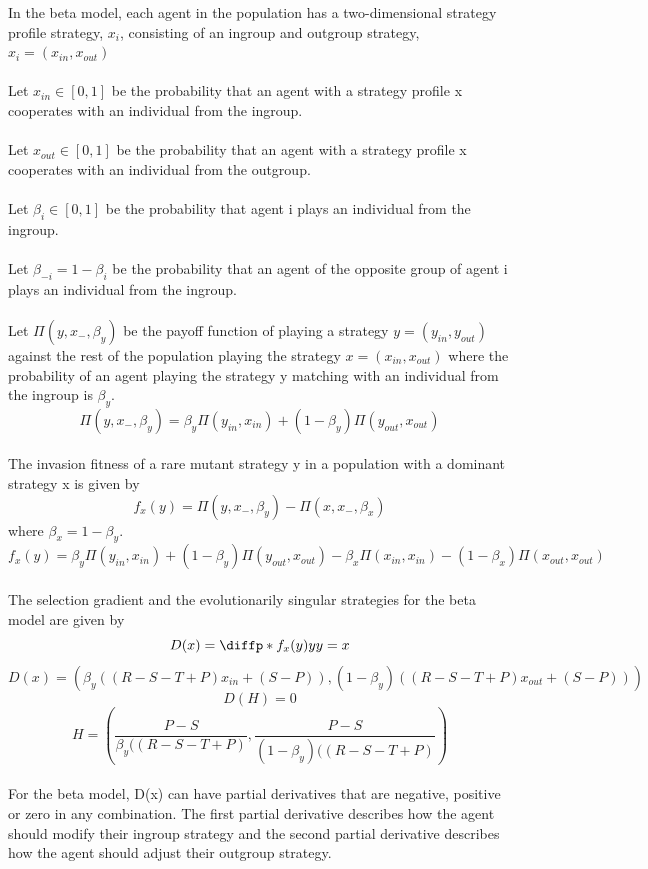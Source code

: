 \documentclass[]{llncs}
\begin{document}
In the beta model, each agent in the population has a two-dimensional strategy profile strategy, $x_i$, consisting of an ingroup and outgroup strategy,  $x_i = (x_{in}, x_{out})$\\
\\
Let $x_{in} \in [0,1]$ be the probability that an agent with a strategy profile x cooperates with an individual from the ingroup. \\
\\
Let $x_{out} \in [0,1]$ be the probability that an agent with a strategy profile x cooperates with an individual from the outgroup. \\
\\
Let $\beta_i \in [0,1]$ be the probability that agent i plays an individual from the ingroup.\\
\\
Let $\beta_{-i} = 1 -\beta_i $ be the probability that an agent of the opposite group of agent i plays an individual from the ingroup.\\
\\
Let $ \Pi ( y, x_{-}, \beta_y)$ be the payoff function of playing a strategy $y = (y_{in}, y_{out}) $ against the rest of the population playing the strategy $x = (x_{in}, x_{out})$ where the probability of an agent playing the strategy y matching with an individual from the ingroup is $\beta_y$.
\[
\Pi ( y, x_{-} , \beta_y) = \beta_y \Pi ( y_{in}, x_{in}) + (1-\beta_y) \Pi ( y_{out}, x_{out} ) 
\]
\\
The invasion fitness of a rare mutant strategy y in a population with a dominant strategy x is given by 
\[
f_x(y) = \Pi ( y, x_{-} , \beta_y) - \Pi ( x, x_{-} , \beta_x) 
\]
where $\beta_x = 1 - \beta_y.$
\[
f_x(y) = \beta_y \Pi ( y_{in}, x_{in}) + (1-\beta_y) \Pi ( y_{out}, x_{out} )  - \beta_x \Pi ( x_{in}, x_{in}) - (1-\beta_x) \Pi ( x_{out}, x_{out} ) 
\]
\\
The selection gradient and the evolutionarily singular strategies for the beta model are given by 
\[
D(x) = \diffp*{f_x(y)}{y}{y=x}
\]
\[
D(x) = (\beta_y((R - S - T + P) x_{in} + (S-P)), (1-\beta_y)((R - S - T + P) x_{out} + (S-P)))
\]
\[
D(H) = 0 
\]
\[
H = (\frac{P-S}{\beta_y((R - S - T + P) }, \frac{P-S}{(1-\beta_y)((R - S - T + P) }) 
\]
\\
For the beta model, D(x) can have partial derivatives that are negative, positive or zero in any combination. The first partial derivative describes how the agent should modify their ingroup strategy and the second partial derivative describes how the agent should adjust their outgroup strategy. 
\end{document}

